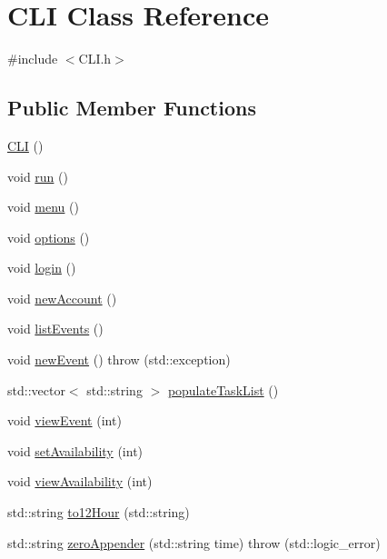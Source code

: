 \hypertarget{class_c_l_i}{}\section{C\+LI Class Reference}
\label{class_c_l_i}


{\ttfamily \#include $<$C\+L\+I.\+h$>$}

\subsection*{Public Member Functions}
\begin{DoxyCompactItemize}
\item 
\mbox{\hyperlink{class_c_l_i_a1a5b0f7ec3b242c5c56e4745adbb391e}{C\+LI}} ()
\item 
void \mbox{\hyperlink{class_c_l_i_aeefc8cd81999836a90c2cfaced6177f1}{run}} ()
\item 
void \mbox{\hyperlink{class_c_l_i_acbbc753079ff02e87dd31e5b3f3bcbf9}{menu}} ()
\item 
void \mbox{\hyperlink{class_c_l_i_ac887b1d04b359b0687c18b7fd3c9db55}{options}} ()
\item 
void \mbox{\hyperlink{class_c_l_i_a4036374bc8e006272b17d762a2be8396}{login}} ()
\item 
void \mbox{\hyperlink{class_c_l_i_a87779d0cdc7d0d54839bfacdc0b27e9e}{new\+Account}} ()
\item 
void \mbox{\hyperlink{class_c_l_i_a4671c459b20aadcca2b9d1ecba63ba0c}{list\+Events}} ()
\item 
void \mbox{\hyperlink{class_c_l_i_a601b6eb021d5348a44450dc95c2fe4ac}{new\+Event}} ()  throw (std\+::exception)
\item 
std\+::vector$<$ std\+::string $>$ \mbox{\hyperlink{class_c_l_i_a89320677b9fb2a4ab06a76834cbf3e33}{populate\+Task\+List}} ()
\item 
void \mbox{\hyperlink{class_c_l_i_ad8e11f03fc813b829ecb1a9ab717b7d7}{view\+Event}} (int)
\item 
void \mbox{\hyperlink{class_c_l_i_a0546e36efd50af1c80eee2ed47ac4f12}{set\+Availability}} (int)
\item 
void \mbox{\hyperlink{class_c_l_i_aaaacd336786c8f895b349889866cf610}{view\+Availability}} (int)
\item 
std\+::string \mbox{\hyperlink{class_c_l_i_ae6622010128f1170365f1e533721107e}{to12\+Hour}} (std\+::string)
\item 
std\+::string \mbox{\hyperlink{class_c_l_i_a7658c13977b4fe125d28dc790692ed37}{zero\+Appender}} (std\+::string time)  throw (std\+::logic\+\_\+error)
\end{DoxyCompactItemize}


